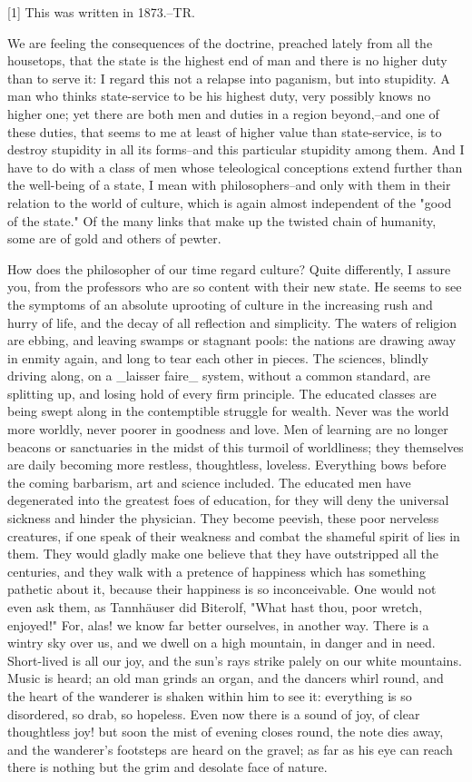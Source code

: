     [1] This was written in 1873.--TR.

We are feeling the consequences of the doctrine, preached lately from
all the housetops, that the state is the highest end of man and there
is no higher duty than to serve it: I regard this not a relapse into
paganism, but into stupidity. A man who thinks state-service to be
his highest duty, very possibly knows no higher one; yet there are
both men and duties in a region beyond,--and one of these duties,
that seems to me at least of higher value than state-service, is to
destroy stupidity in all its forms--and this particular stupidity
among them. And I have to do with a class of men whose teleological
conceptions extend further than the well-being of a state, I mean
with philosophers--and only with them in their relation to the world
of culture, which is again almost independent of the "good of the
state." Of the many links that make up the twisted chain of humanity,
some are of gold and others of pewter.

How does the philosopher of our time regard culture? Quite
differently, I assure you, from the professors who are so content
with their new state. He seems to see the symptoms of an absolute
uprooting of culture in the increasing rush and hurry of life, and
the decay of all reflection and simplicity. The waters of religion
are ebbing, and leaving swamps or stagnant pools: the nations are
drawing away in enmity again, and long to tear each other in pieces.
The sciences, blindly driving along, on a _laisser faire_ system,
without a common standard, are splitting up, and losing hold of every
firm principle. The educated classes are being swept along in the
contemptible struggle for wealth. Never was the world more worldly,
never poorer in goodness and love. Men of learning are no longer
beacons or sanctuaries in the midst of this turmoil of worldliness;
they themselves are daily becoming more restless, thoughtless,
loveless. Everything bows before the coming barbarism, art and
science included. The educated men have degenerated into the greatest
foes of education, for they will deny the universal sickness and
hinder the physician. They become peevish, these poor nerveless
creatures, if one speak of their weakness and combat the shameful
spirit of lies in them. They would gladly make one believe that they
have outstripped all the centuries, and they walk with a pretence of
happiness which has something pathetic about it, because their
happiness is so inconceivable. One would not even ask them, as
Tannhäuser did Biterolf, "What hast thou, poor wretch, enjoyed!" For,
alas! we know far better ourselves, in another way. There is a wintry
sky over us, and we dwell on a high mountain, in danger and in need.
Short-lived is all our joy, and the sun's rays strike palely on our
white mountains. Music is heard; an old man grinds an organ, and the
dancers whirl round, and the heart of the wanderer is shaken within
him to see it: everything is so disordered, so drab, so hopeless.
Even now there is a sound of joy, of clear thoughtless joy! but soon
the mist of evening closes round, the note dies away, and the
wanderer's footsteps are heard on the gravel; as far as his eye can
reach there is nothing but the grim and desolate face of nature.


